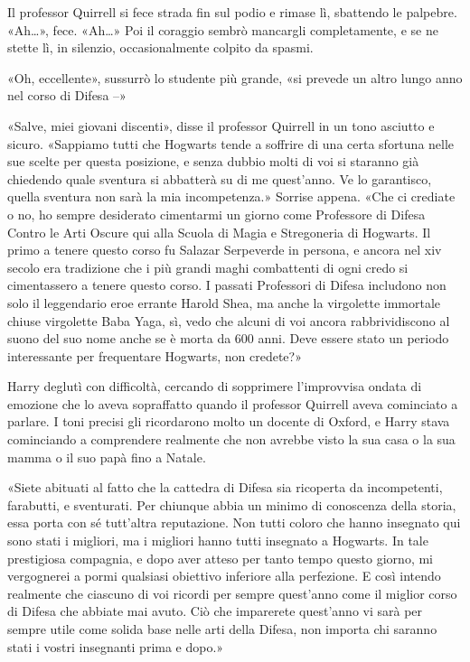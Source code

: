 Il professor Quirrell si fece strada fin sul podio e rimase lì, sbattendo le palpebre. «Ah…», fece. «Ah…» Poi il coraggio sembrò mancargli completamente, e se ne stette lì, in silenzio, occasionalmente colpito da spasmi.

«Oh, eccellente», sussurrò lo studente più grande, «si prevede un altro lungo anno nel corso di Difesa –»

«Salve, miei giovani discenti», disse il professor Quirrell in un tono asciutto e sicuro. «Sappiamo tutti che Hogwarts tende a soffrire di una certa sfortuna nelle sue scelte per questa posizione, e senza dubbio molti di voi si staranno già chiedendo quale sventura si abbatterà su di me quest’anno. Ve lo garantisco, quella sventura non sarà la mia incompetenza.» Sorrise appena. «Che ci crediate o no, ho sempre desiderato cimentarmi un giorno come Professore di Difesa Contro le Arti Oscure qui alla Scuola di Magia e Stregoneria di Hogwarts. Il primo a tenere questo corso fu Salazar Serpeverde in persona, e ancora nel xiv secolo era tradizione che i più grandi maghi combattenti di ogni credo si cimentassero a tenere questo corso. I passati Professori di Difesa includono non solo il leggendario eroe errante Harold Shea, ma anche la virgolette immortale chiuse virgolette Baba Yaga, sì, vedo che alcuni di voi ancora rabbrividiscono al suono del suo nome anche se è morta da 600 anni. Deve essere stato un periodo interessante per frequentare Hogwarts, non credete?»

Harry deglutì con difficoltà, cercando di sopprimere l’improvvisa ondata di emozione che lo aveva sopraffatto quando il professor Quirrell aveva cominciato a parlare. I toni precisi gli ricordarono molto un docente di Oxford, e Harry stava cominciando a comprendere realmente che non avrebbe visto la sua casa o la sua mamma o il suo papà fino a Natale.

«Siete abituati al fatto che la cattedra di Difesa sia ricoperta da incompetenti, farabutti, e sventurati. Per chiunque abbia un minimo di conoscenza della storia, essa porta con sé tutt’altra reputazione. Non tutti coloro che hanno insegnato qui sono stati i migliori, ma i migliori hanno tutti insegnato a Hogwarts. In tale prestigiosa compagnia, e dopo aver atteso per tanto tempo questo giorno, mi vergognerei a pormi qualsiasi obiettivo inferiore alla perfezione. E così intendo realmente che ciascuno di voi ricordi per sempre quest’anno come il miglior corso di Difesa che abbiate mai avuto. Ciò che imparerete quest’anno vi sarà per sempre utile come solida base nelle arti della Difesa, non importa chi saranno stati i vostri insegnanti prima e dopo.»

